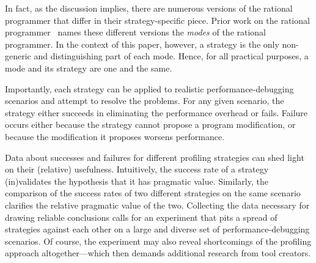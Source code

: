 In fact, as the discussion implies, there are numerous versions of the
rational programmer that differ in their strategy-specific piece. Prior
work on the rational programmer~\cite{lgfd-icfp-2021} names these different
versions the \emph{modes} of the rational programmer.  In the context of
this paper, however, a strategy is the only non-generic and distinguishing
part of each mode. Hence, for all practical purposes, 
a mode and its strategy are one and the same. 

Importantly, each strategy can be applied to realistic
performance-debugging scenarios and attempt to resolve the problems.  For
any given scenario, the strategy either succeeds in eliminating the
performance overhead or fails. Failure occurs either because the strategy
cannot propose a program modification, or because the modification it
proposes worsens performance. 

Data about successes and failures for different profiling strategies can
shed light on their (relative) usefulness.  Intuitively, the success rate
of a strategy (in)validates the hypothesis that it has pragmatic value.
Similarly, the comparison of the success rates of two different strategies
on the same scenario clarifies the relative pragmatic value of the two.
Collecting the data necessary for drawing reliable conclusions calls for
an experiment that pits a spread of strategies against each other on a
large and diverse set of performance-debugging scenarios. Of course, the
experiment may also reveal shortcomings of the profiling approach
altogether---which then demands additional research from tool creators. 

